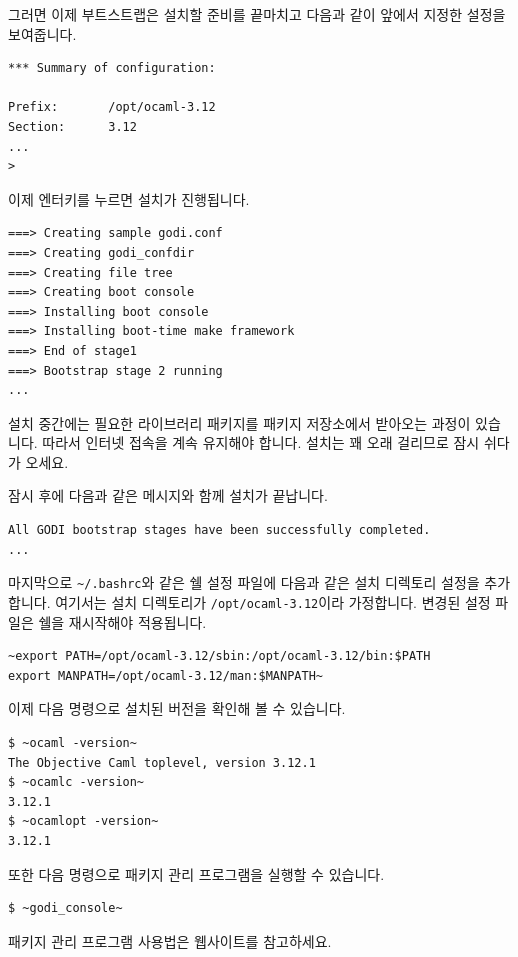 그러면 이제 부트스트랩은 설치할 준비를 끝마치고 다음과 같이 앞에서 지정한
설정을 보여줍니다.

\begin{lstlisting}
*** Summary of configuration:

Prefix:       /opt/ocaml-3.12
Section:      3.12
...
>
\end{lstlisting}

이제 엔터키를 누르면 설치가 진행됩니다.

\begin{lstlisting}
===> Creating sample godi.conf
===> Creating godi_confdir
===> Creating file tree
===> Creating boot console
===> Installing boot console
===> Installing boot-time make framework
===> End of stage1
===> Bootstrap stage 2 running
...
\end{lstlisting}

설치 중간에는 필요한 라이브러리 패키지를 \GODI{} 패키지 저장소에서 받아오는
과정이 있습니다. 따라서 인터넷 접속을 계속 유지해야 합니다. 설치는 꽤 오래
걸리므로 잠시 쉬다가 오세요.

잠시 후에 다음과 같은 메시지와 함께 설치가 끝납니다.
\begin{lstlisting}
All GODI bootstrap stages have been successfully completed.
...
\end{lstlisting}

마지막으로 \texttt{\~{}/.bashrc}와 같은 쉘 설정 파일에 다음과 같은 설치
디렉토리 설정을 추가합니다. 여기서는 설치 디렉토리가 \texttt{/opt/ocaml-3.12}이라
가정합니다. 변경된 설정 파일은 쉘을 재시작해야 적용됩니다.

\begin{lstlisting}
~export PATH=/opt/ocaml-3.12/sbin:/opt/ocaml-3.12/bin:$PATH
export MANPATH=/opt/ocaml-3.12/man:$MANPATH~
\end{lstlisting}

이제 다음 명령으로 설치된 \OCAML{} 버전을 확인해 볼 수 있습니다.

\begin{lstlisting}
$ ~ocaml -version~
The Objective Caml toplevel, version 3.12.1
$ ~ocamlc -version~
3.12.1
$ ~ocamlopt -version~
3.12.1
\end{lstlisting}

또한 다음 명령으로 \GODI{} 패키지 관리 프로그램을 실행할 수 있습니다.

\begin{lstlisting}
$ ~godi_console~
\end{lstlisting}

패키지 관리 프로그램 사용법은 \GODI{} 웹사이트를 참고하세요.

